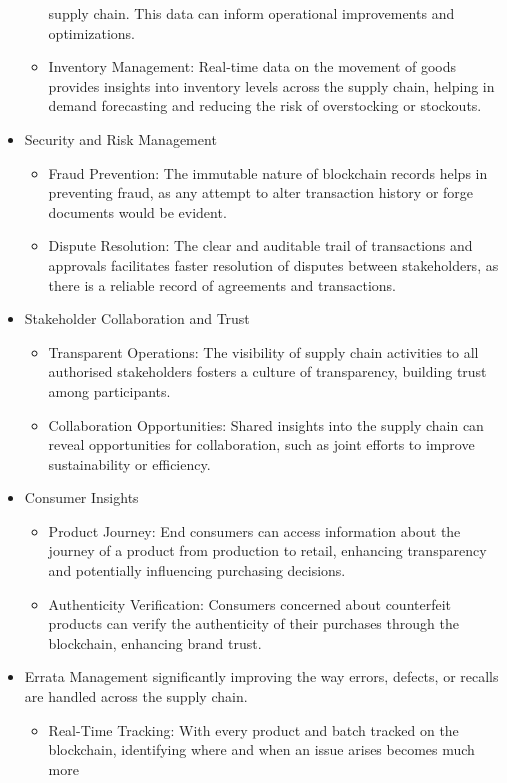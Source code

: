 \documentclass{tufte-handout}
\begin{document}
\begin{itemize}
\begin{itemize}
    supply chain. This data can inform operational improvements and optimizations.
    \item Inventory Management: Real-time data on the movement of goods provides insights into inventory levels across the supply chain, helping in
    demand forecasting and reducing the risk of overstocking or stockouts.
\end{itemize}
\item Security and Risk Management
\begin{itemize}
    \item Fraud Prevention: The immutable nature of blockchain records helps in preventing fraud, as any attempt to alter transaction history or forge
    documents would be evident.
    \item Dispute Resolution: The clear and auditable trail of transactions and approvals facilitates faster resolution of disputes between stakeholders,
    as there is a reliable record of agreements and transactions.
\end{itemize}
\item Stakeholder Collaboration and Trust
\begin{itemize}
    \item Transparent Operations: The visibility of supply chain activities to all authorised stakeholders fosters a culture of transparency, building
    trust among participants.
    \item Collaboration Opportunities: Shared insights into the supply chain can reveal opportunities for collaboration, such as joint efforts to
    improve sustainability or efficiency.
\end{itemize}
\item Consumer Insights
\begin{itemize}
    \item Product Journey: End consumers can access information about the journey of a product from production to retail, enhancing transparency and
    potentially influencing purchasing decisions.
    \item Authenticity Verification: Consumers concerned about counterfeit products can verify the authenticity of their purchases through the blockchain,
    enhancing brand trust.
\end{itemize}
\item Errata Management significantly improving the way errors, defects, or recalls are handled across the supply chain.
\begin{itemize}
    \item Real-Time Tracking: With every product and batch tracked on the blockchain, identifying where and when an issue arises becomes much more

\end{itemize}
\end{itemize}
\end{document}
